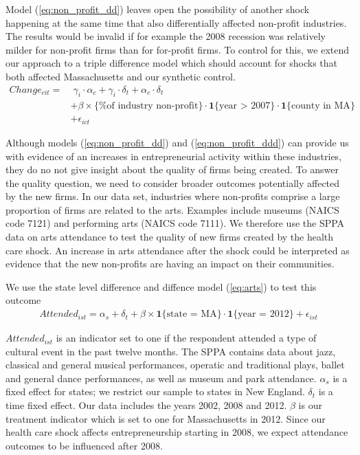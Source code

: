 \documentclass[12pt]{article}
\begin{document}
Model (\ref{eq:non_profit_dd}) leaves open the possibility of another shock happening at the same time that also differentially affected non-profit industries. The results would be invalid if for example the 2008 recession was relatively milder for non-profit firms than for for-profit firms. To control for this, we extend our approach to a triple difference model which should account for shocks that both affected Massachusetts and our synthetic control. 
\begin{align} \label{eq:non_profit_ddd}
Change_{cit} = & \; \gamma_i \cdot \alpha_c + \gamma_i \cdot \delta_t +  \alpha_c \cdot \delta_t \nonumber   \\
& + \beta  \times \{\text{\% of industry non-profit}\} \cdot \mathbf{1}\{\text{year > 2007}\}  \cdot \mathbf{1}\{\text{county in  MA}\} \nonumber  \\
& + \epsilon_{ict}
\end{align}

Although models (\ref{eq:non_profit_dd}) and (\ref{eq:non_profit_ddd}) can provide us with evidence of an increases in entrepreneurial activity within these industries, they do no not give insight about the quality of firms being created. To answer the quality question, we need to consider broader outcomes potentially affected by the new firms. In our data set, industries where non-profits comprise a large proportion of firms are related to the arts. Examples include museums (NAICS code 7121) and performing arts (NAICS code 7111). We therefore use the SPPA data on arts attendance to test the quality of new firms created by the health care shock. An increase in arts attendance after the shock could be interpreted as evidence that the new non-profits are having an impact on their communities. 

We use the state level difference and diffence model (\ref{eq:arts}) to test this outcome
\begin{align} \label{eq:arts}
Attended_{ist} = \alpha_s + \delta_t + \beta  \times \mathbf{1}\{\text{state = MA}\} \cdot \mathbf{1}\{\text{year = 2012}\} + \epsilon_{ist}
\end{align}

$Attended_{ist}$ is an indicator set to one if the respondent attended a type of cultural event in the past twelve months. The SPPA contains data about jazz, classical and general musical performances, operatic and traditional plays, ballet and general dance performances, as well as museum and park attendance. $\alpha_s$ is a fixed effect for states; we restrict our sample to states in New England. $\delta_t$ is a time fixed effect. Our data includes the years 2002, 2008 and 2012. $\beta$ is our treatment indicator which is set to one for Massachusetts in 2012. Since our health care shock affects entrepreneurship starting in 2008, we expect attendance outcomes to be influenced after 2008. 
\end{document}
